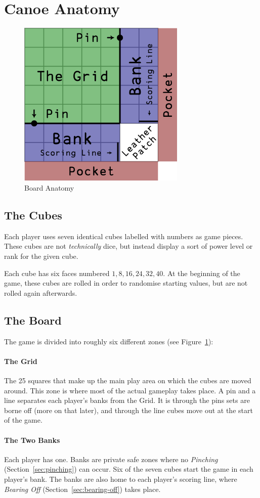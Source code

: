 \section{Canoe Anatomy}
\begin{figure}[!ht]
    \centering
    \includegraphics[width=8cm]{../graphics/zones}
    \caption{Board Anatomy}
    \label{fig:board-anatomy}
\end{figure}
\subsection{The Cubes}
Each player uses seven identical cubes labelled with numbers as game pieces.
These cubes are not \textit{technically} dice, but instead display a sort of power level or rank for the given cube.

Each cube has six faces numbered $1, 8, 16, 24, 32, 40$. 
At the beginning of the game, these cubes are rolled in order to randomise starting values, but are not rolled again afterwards.
\subsection{The Board}
The game is divided into roughly six different zones (see Figure~\ref{fig:board-anatomy}):
\paragraph{The Grid} The 25 squares that make up the main play area on which the cubes are moved around. 
This zone is where most of the actual gameplay takes place.
A pin and a line separates each player's banks from the Grid.
It is through the pins sets are borne off (more on that later), and through the line cubes move out at the start of the game.
\paragraph{The Two Banks} Each player has one. Banks are private safe zones where no \textit{Pinching} (Section~\ref{sec:pinching}) can occur. Six of the seven cubes start the game in each player's bank.
The banks are also home to each player's scoring line, where \textit{Bearing Off} (Section~\ref{sec:bearing-off}) takes place.
